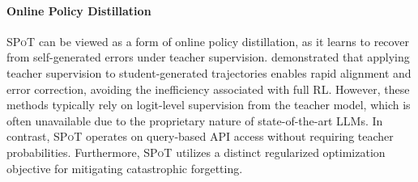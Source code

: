 \documentclass{article}
\newcommand{\methodName}{{\textsc{SPoT}}\xspace}
\theoremstyle{plain}
\theoremstyle{definition}
\theoremstyle{remark}
\begin{document}
\paragraph{Online Policy Distillation}
\methodName can be viewed as a form of online policy distillation, as it learns to recover from self-generated errors under teacher supervision. \citet{agarwal2024policy,lu2025onpolicydistillation} demonstrated that applying teacher supervision to student-generated trajectories enables rapid alignment and error correction, avoiding the inefficiency associated with full RL. However, these methods typically rely on logit-level supervision from the teacher model, which is often unavailable due to the proprietary nature of state-of-the-art LLMs. In contrast, \methodName operates on query-based API access without requiring teacher probabilities. Furthermore, \methodName utilizes a distinct regularized optimization objective for mitigating catastrophic forgetting.
\end{document}
